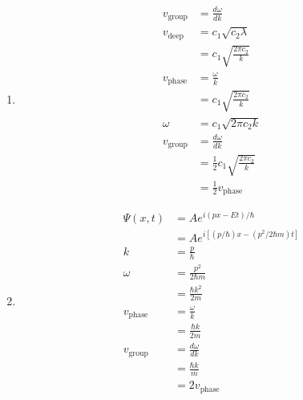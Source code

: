 \documentclass{article}
\begin{document}
\setcounter{subsection}{22}
\subsection{}

\begin{enumerate}
  \item

        \begin{align*}
          v_\text{group} & = \frac{d \omega}{d k}                       \\
          v_\text{deep}  & = c_1 \sqrt{c_2 \lambda}                     \\
                         & = c_1 \sqrt{\frac{2 \pi c_2}{k}}             \\
          v_\text{phase} & = \frac{\omega}{k}                           \\
                         & = c_1 \sqrt{\frac{2 \pi c_2}{k}}             \\
          \omega         & = c_1 \sqrt{2 \pi c_2 k}                     \\
          v_\text{group} & = \frac{d \omega}{d k}                       \\
                         & = \frac{1}{2} c_1 \sqrt{\frac{2 \pi c_2}{k}} \\
                         & = \frac{1}{2} v_\text{phase}
        \end{align*}

  \item

        \begin{align*}
          \Psi(x, t)     & = A e^{i (p x - E t) / \hbar}                   \\
                         & = A e^{i [(p / \hbar) x - (p^2 / 2 \hbar m) t]} \\
          k              & = \frac{p}{\hbar}                               \\
          \omega         & = \frac{p^2}{2 \hbar m}                         \\
                         & = \frac{\hbar k^2}{2 m}                         \\
          v_\text{phase} & = \frac{\omega}{k}                              \\
                         & = \frac{\hbar k}{2 m}                           \\
          v_\text{group} & = \frac{d \omega}{d k}                          \\
                         & = \frac{\hbar k}{m}                             \\
                         & = 2 v_\text{phase}
        \end{align*}
\end{enumerate}
\end{document}
